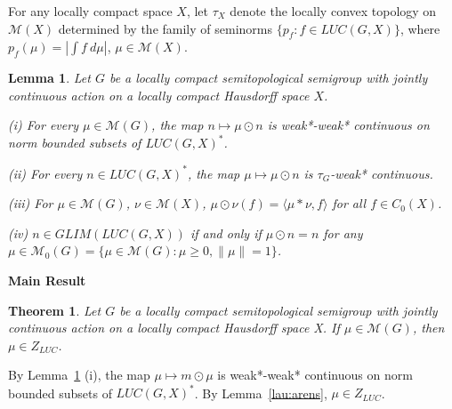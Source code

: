 \documentclass[landscape]{slides}
\newtheorem{theorem}[defn]{Theorem}
\newtheorem{lemma}[defn]{Lemma}
\begin{document}
\begin{slide}
For any locally compact space $X$, let $\tau_X$ denote the locally convex topology on $\mathcal{M}(X)$
determined by the family of seminorms $\{p_f : f\in LUC(G,X)\}$, where
$p_f (\mu) =| \int f\:d\mu|$, $\mu\in \mathcal{M}(X)$.\\

\begin{lemma}\label{wong}
Let $G$ be a locally compact semitopological semigroup with jointly continuous action
on a locally compact Hausdorff space $X$.
\begin{list}{}{\itemsep -6pt \topsep -6pt}
\item[(i)] For every $\mu\in \mathcal{M}(G)$, the map $n \mapsto {\mu}\odot n$ is weak*-weak* continuous on norm bounded subsets of $LUC(G,X)^*$.
\item[(ii)] For every $n\in LUC(G,X)^*$, the map $\mu\mapsto {\mu}\odot n$ is $\tau_G$-weak* continuous.
\item[(iii)] For $\mu\in \mathcal{M}(G)$, $\nu\in \mathcal{M}(X)$, ${\mu}\odot{\nu}(f) = \langle\mu * \nu, f\rangle$ for all $f\in C_0(X)$.
\item[(iv)] $n\in GLIM(LUC(G,X))$ if and only if ${\mu}\odot n = n$ for any $\mu\in \mathcal{M}_0 (G) = \{\mu\in \mathcal{M}(G) : \mu \geq 0, \|\mu\| = 1\}$.
\end{list}
\end{lemma}
\end{slide}

\begin{slide}
{\bf Main Result}\\
\begin{theorem}\label{wong2}
Let $G$ be a locally compact semitopological semigroup with jointly continuous action
on a locally compact Hausdorff space X. If $\mu \in \mathcal{M}(G)$, then ${\mu} \in Z_{LUC}$.
\end{theorem}
\proof
By Lemma~\ref{wong} (i), the map ${\mu} \mapsto m\odot {\mu}$ is weak*-weak* continuous on norm bounded subsets
of $LUC(G,X)^*$.  By Lemma~\ref{lau:arens}, ${\mu} \in Z_{LUC}$.
\done
\end{slide}
\end{document}
